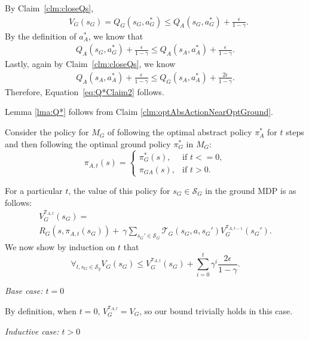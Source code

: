 By Claim~\ref{clm:closeQs},
\begin{align}
&V_G(s_G) = Q_G(s_G, a^*_G) \leq Q_A(s_G, a^*_G) + \frac{\epsilon}{1-\gamma}.
\label{eq:Q*OptActionResult}
\end{align}
By the definition of $a^*_A$, we know that 
\begin{align}
Q_A(s_G, a^*_G) + \frac{\epsilon}{1-\gamma} \leq Q_A(s_A, a^*_A) + \frac{\epsilon}{1-\gamma}.
\end{align}
Lastly, again by Claim~\ref{clm:closeQs}, we know
\begin{align}
Q_A(s_A, a^*_A) + \frac{\epsilon}{1-\gamma} \leq Q_G(s_A, a^*_A) + \frac{2\epsilon}{1-\gamma}.
\end{align}
Therefore, Equation~\ref{eq:Q*Claim2} follows.

\begin{clm}
Lemma \ref{lma:Q*} follows from Claim \ref{clm:optAbsActionNearOptGround}.
\label{clm:lmaFromClm}
\end{clm}

Consider the policy for $M_G$ of following the optimal abstract policy $\pi^*_A$ for $t$ steps and then following the optimal ground policy $\pi^*_G$ in $M_G$:
\begin{equation}
\pi_{A,t}(s)=
\begin{cases}
\pi_G^*(s), &\text{if } t<=0,\\
\pi_{GA}(s), &\text{if } t > 0.
\end{cases}
\end{equation}

For a particular $t$, the value of this policy for $s_G \in \mathcal{S}_G$ in the ground \ac{MDP} is as follows:
\begin{multline*}
V_G^{\pi_{A,t}}(s_G) = \\
R_G(s, \pi_{A,t}(s_G)) +\ \gamma \sum_{{s_G}' \in \mathcal{S}_G}\mathcal{T}_G(s_G, a, {s_G}')V_G^{\pi_{A,t-1}}({s_G}').
\end{multline*}
We now show by induction on $t$ that
\begin{equation}
\forall_{t, s_G \in \mathcal{S}_g} V_G(s_G) \leq  V_G^{\pi_{A,t}}(s_G) + \sum_{i=0}^{t}\gamma^i \frac{2\epsilon}{1-\gamma}.
\end{equation}

\textit{Base case: $t=0$}

By definition, when $t=0$, $V_G^{\pi_{A,t}} = V_G$, so our bound trivially holds in this case.

\textit{Inductive case: $t > 0$}

